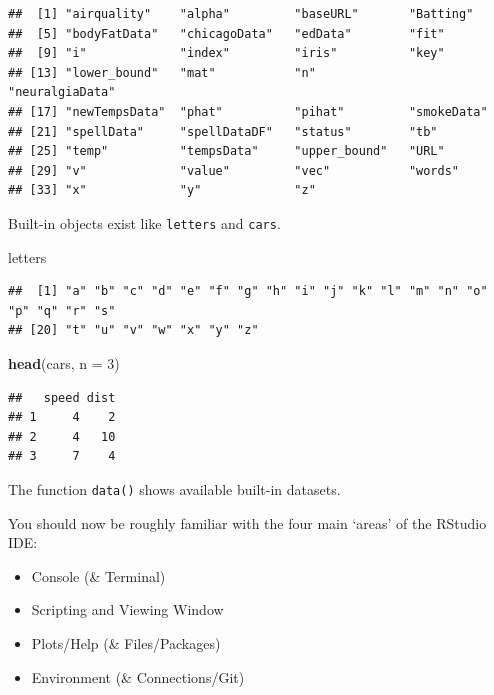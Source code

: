 \documentclass[
]{book}
\newenvironment{Shaded}{\begin{snugshade}}{\end{snugshade}}
\newcommand{\DataTypeTok}[1]{\textcolor[rgb]{0.13,0.29,0.53}{#1}}
\newcommand{\DecValTok}[1]{\textcolor[rgb]{0.00,0.00,0.81}{#1}}
\newcommand{\KeywordTok}[1]{\textcolor[rgb]{0.13,0.29,0.53}{\textbf{#1}}}
\newcommand{\NormalTok}[1]{#1}
\theoremstyle{definition}
\theoremstyle{definition}
\theoremstyle{definition}
\theoremstyle{remark}
\begin{document}
\begin{verbatim}
##  [1] "airquality"    "alpha"         "baseURL"       "Batting"      
##  [5] "bodyFatData"   "chicagoData"   "edData"        "fit"          
##  [9] "i"             "index"         "iris"          "key"          
## [13] "lower_bound"   "mat"           "n"             "neuralgiaData"
## [17] "newTempsData"  "phat"          "pihat"         "smokeData"    
## [21] "spellData"     "spellDataDF"   "status"        "tb"           
## [25] "temp"          "tempsData"     "upper_bound"   "URL"          
## [29] "v"             "value"         "vec"           "words"        
## [33] "x"             "y"             "z"
\end{verbatim}

Built-in objects exist like \texttt{letters} and \texttt{cars}.

\begin{Shaded}
\begin{Highlighting}[]
\NormalTok{letters}
\end{Highlighting}
\end{Shaded}

\begin{verbatim}
##  [1] "a" "b" "c" "d" "e" "f" "g" "h" "i" "j" "k" "l" "m" "n" "o" "p" "q" "r" "s"
## [20] "t" "u" "v" "w" "x" "y" "z"
\end{verbatim}

\begin{Shaded}
\begin{Highlighting}[]
\KeywordTok{head}\NormalTok{(cars, }\DataTypeTok{n =} \DecValTok{3}\NormalTok{)}
\end{Highlighting}
\end{Shaded}

\begin{verbatim}
##   speed dist
## 1     4    2
## 2     4   10
## 3     7    4
\end{verbatim}

The function \texttt{data()} shows available built-in datasets.

You should now be roughly familiar with the four main `areas' of the RStudio IDE:

\begin{itemize}
\item
  Console (\& Terminal)
\item
  Scripting and Viewing Window
\item
  Plots/Help (\& Files/Packages)
\item
  Environment (\& Connections/Git)
\end{itemize}
\end{document}
